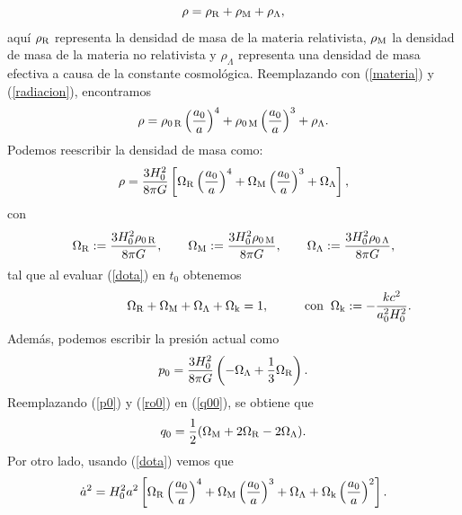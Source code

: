 \begin{equation}
\rho = \rho_{\rm{R}} + \rho_{\rm{M}} + \rho_{\rm{\Lambda}},
\end{equation}
aquí $\rho_{\rm{R}}$ representa la densidad de masa de la materia relativista, $\rho_{\rm{M}}$ la densidad de masa de la materia no relativista y $\rho_\Lambda$ representa una densidad de masa efectiva a causa de la constante cosmológica. Reemplazando con (\ref{materia}) y (\ref{radiacion}), encontramos
\begin{equation}
\rho = \rho_{0\,\rm{R}}\left(\frac{a_0}{a}\right)^{4} + \rho_{0\,\rm{M}}\left(\frac{a_0}{a}\right)^{3} + \rho_{\rm{\Lambda}}.
\end{equation}
Podemos reescribir la densidad de masa como:
\begin{equation}
\rho = \frac{3H_0^2}{8\pi G}\left[\Omega_{\rm{R}}\left(\frac{a_0}{a}\right)^{4} + \Omega_{\rm{M}}\left(\frac{a_0}{a}\right)^{3} + \Omega_{\rm{\Lambda}}\right], \label{ro0}
\end{equation}
con
\begin{eqnarray}
\Omega_{\rm{R}} := \frac{3H_0^2\rho_{0\,\rm{R}}}{8\pi G},\qquad 
\Omega_{\rm{M}} := \frac{3H_0^2\rho_{0\,\rm{M}}}{8\pi G}, \qquad
\Omega_{\rm{\Lambda}} := \frac{3H_0^2 \rho_{0\,\rm{\Lambda}}}{8\pi G},
\end{eqnarray}
tal que al evaluar (\ref{dota}) en $t_0$ obtenemos
\begin{equation}
\hspace{2cm} \Omega_{\rm{R}} +\Omega_{\rm{M}} +\Omega_{\rm{\Lambda}} +\Omega_{\rm{k}} =1, \hspace{1cm} \mbox{con} \hspace{0.2cm} \Omega_{\rm{k}} := -\frac{kc^2}{a_0^2H_0^2}. 
\end{equation}
Además, podemos escribir la presión actual como
\begin{equation}
p_0=\frac{3H_0^2}{8\pi G}\left( -\Omega_{\rm{\Lambda}}  +\frac{1}{3}\Omega_{\rm{R}} \right). \label{p0}
\end{equation}
Reemplazando (\ref{p0}) y (\ref{ro0}) en (\ref{q00}), se obtiene que
\begin{equation}
q_0=\frac{1}{2}(\Omega_{\rm{M}} + 2\Omega_{\rm{R}}  - 2\Omega_{\rm{\Lambda}}).  \label{q0omega}
\end{equation}
Por otro lado, usando (\ref{dota}) vemos que
\begin{equation}
 \dot a^2 = H_0^2 a^2\left[\Omega_{\rm{R}}\left(\frac{a_0}{a}\right)^{4} + \Omega_{\rm{M}}\left(\frac{a_0}{a}\right)^{3} + \Omega_{\rm{\Lambda}} +\Omega_{\rm{k}}\left(\frac{a_0}{a}\right)^{2} \right]. 
\end{equation}
